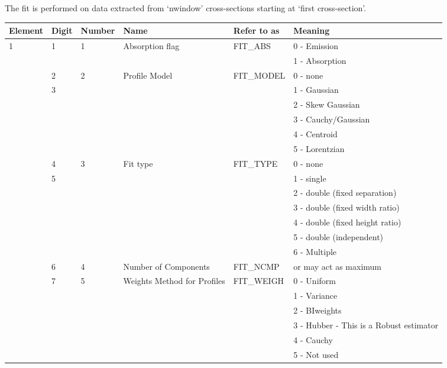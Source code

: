 \documentclass[11pt,twoside]{article}
\newenvironment{latexonly}{}{}
\begin{document}
The fit is performed on data extracted from `nwindow' cross-sections
starting at `first cross-section'.

\begin{latexonly}
\begin{table}
\begin{center}
\tiny
\begin{tabular}{|l|l|l|l|l|l|} \hline
Element & Digit & Number & Name & Refer to as &Meaning\\ \hline
1 & 1 & 1 & Absorption flag & FIT\_ABS & 0 - Emission\\
  &   &   &                 & & 1 - Absorption\\ \cline{2-6}
  & 2 & 2 & Profile Model & FIT\_MODEL & 0 - none\\
  & 3 &   &               &            & 1 - Gaussian\\
  &   &   &               &            & 2 - Skew Gaussian\\
  &   &   &               &            & 3 - Cauchy/Gaussian\\
  &   &   &               &            & 4 - Centroid\\
  &   &   &               &            & 5 - Lorentzian\\ \cline{2-6}
  & 4 & 3 & Fit type      & FIT\_TYPE & 0 - none \\
  & 5 &   &               &           & 1 - single \\
  &   &   &               &           & 2 - double (fixed separation) \\
  &   &   &               &          & 3 - double (fixed width ratio) \\
  &   &   &               &         & 4 - double (fixed height ratio) \\
  &   &   &               &           & 5 - double (independent) \\
  &   &   &               &           & 6 - Multiple \\ \cline{2-6}
  & 6 & 4 & Number of Components & FIT\_NCMP & or may act as maximum\\
\cline{2-6}
  & 7 & 5 & Weights Method for Profiles & FIT\_WEIGH & 0 - Uniform\\
  &   &   & & & 1 - Variance\\
  &   &   & & & 2 - BIweights\\
  &   &   & & & 3 - Hubber - This is a Robust estimator\\
  &   &   & & & 4 - Cauchy\\
  &   &   & & & 5 - Not used \\

\end{tabular}
\end{center}
\end{table}
\end{latexonly}
\end{document}
